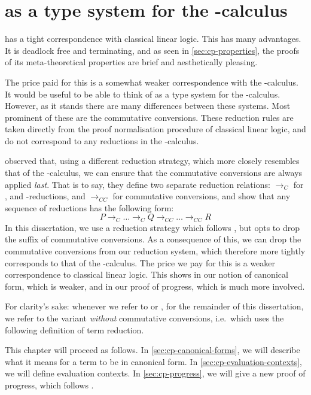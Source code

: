 \chapter{\cp as a type system for the \textpi-calculus}\label{sec:cppi}
\cp has a tight correspondence with classical linear logic.
This has many advantages.
It is deadlock free and terminating, and as seen in \cref{sec:cp-properties},
the proofs of its meta-theoretical properties are brief and aesthetically
pleasing.

The price paid for this is a somewhat weaker correspondence with the
\textpi-calculus.
It would be useful to be able to think of \cp as a type system for the
\textpi-calculus.
However, as it stands there are many differences between these systems.
Most prominent of these are the commutative conversions. These reduction rules
are taken directly from the proof normalisation procedure of classical linear
logic, and do not correspond to any reductions in the \textpi-calculus.

 observed that, using a different reduction
strategy, which more closely resembles that of the \textpi-calculus, we can
ensure that the commutative conversions are always applied \emph{last}.
That is to say, they define two separate reduction relations:
$\longrightarrow_{C}$ for ,  and \textbeta-reductions,
and $\longrightarrow_{CC}$ for commutative conversions, and show that any
sequence of reductions has the following form:
\[
  P \longrightarrow_{C} \dots \longrightarrow_{C} Q \longrightarrow_{CC} \dots \longrightarrow_{CC} R
\]
In this dissertation, we use a reduction strategy which follows
, but opts to drop the suffix of commutative
conversions.
As a consequence of this, we can drop the commutative conversions from our
reduction system, which therefore more tightly corresponds to that of the
\textpi-calculus. 
The price we pay for this is a weaker correspondence to classical linear logic.
This shows in our notion of canonical form, which is weaker, and in our proof of
progress, which is much more involved.

For clarity's sake: whenever we refer to \cp or \rcp, for the remainder of this
dissertation, we refer to the variant \emph{without} commutative conversions,
i.e.\ which uses the following definition of term reduction.


This chapter will proceed as follows.
In \cref{sec:cp-canonical-forms}, we will describe what it means for a term to
be in canonical form.
In \cref{sec:cp-evaluation-contexts}, we will define evaluation contexts.
In \cref{sec:cp-progress}, we will give a new proof of progress, which follows
.


